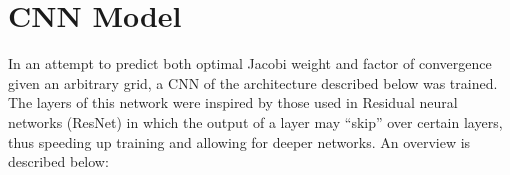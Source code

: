 \section{CNN Model}

In an attempt to predict both optimal Jacobi weight and factor of convergence given an arbitrary grid, a CNN of the architecture described below was trained.  The layers of this network were inspired by those used in Residual neural networks (ResNet) in which the output of a layer may ``skip'' over certain layers, thus speeding up training and allowing for deeper networks.  %
An overview is described below:


